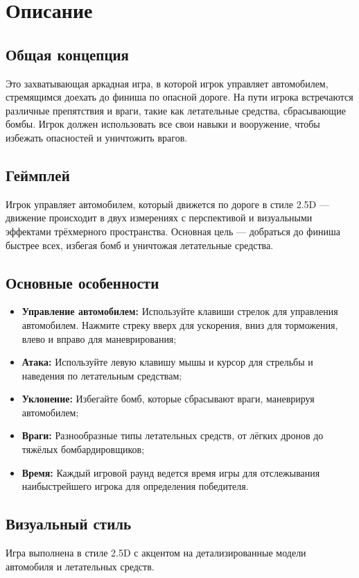 \section{Описание}

\subsection{Общая концепция}
Это захватывающая аркадная игра, в которой игрок управляет автомобилем,
стремящимся доехать до финиша по опасной дороге.
На пути игрока встречаются различные препятствия и враги,
такие как летательные средства, сбрасывающие бомбы.
Игрок должен использовать все свои навыки и вооружение,
чтобы избежать опасностей и уничтожить врагов.

\subsection{Геймплей}
Игрок управляет автомобилем, который движется по дороге
в стиле 2.5D --- движение происходит в двух измерениях с перспективой
и визуальными эффектами трёхмерного пространства.
Основная цель --- добраться до финиша быстрее всех, избегая бомб
и уничтожая летательные средства.

\subsection{Основные особенности}
\begin{itemize}
    \item \textbf{Управление автомобилем:} Используйте клавиши стрелок
		для управления автомобилем. Нажмите стреку вверх для ускорения,
		вниз для торможения, влево и вправо для маневрирования;
    \item \textbf{Атака:} Используйте левую клавишу мышы и курсор
		для стрельбы и наведения по летательным средствам;
    \item \textbf{Уклонение:} Избегайте бомб,
		которые сбрасывают враги, маневрируя автомобилем;
    \item \textbf{Враги:} Разнообразные типы летательных средств,
		от лёгких дронов до тяжёлых бомбардировщиков;
    \item \textbf{Время:} Каждый игровой раунд ведется время игры
		для отслежывания наибыстрейшего игрока для определения победителя.
\end{itemize}

\subsection{Визуальный стиль}
Игра выполнена в стиле 2.5D с акцентом на детализированные модели автомобиля
и летательных средств.

